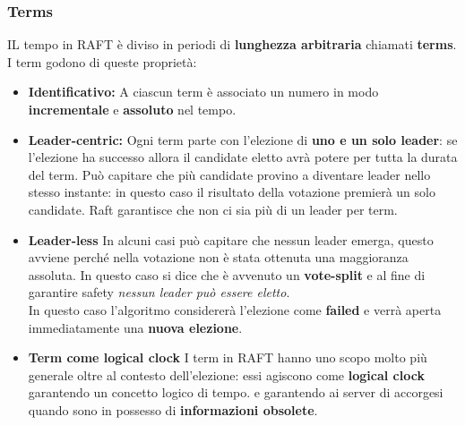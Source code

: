   \subsubsection{Terms}
  IL tempo in RAFT è diviso in periodi di \textbf{lunghezza arbitraria} chiamati \textbf{terms}. I term godono di queste proprietà:
  \begin{itemize}
    \item{\textbf{Identificativo:}}
    A ciascun term è associato un numero in modo \textbf{incrementale} e \textbf{assoluto} nel tempo.
    \item{\textbf{Leader-centric:}}
    Ogni term parte con l'elezione di \textbf{uno e un solo leader}: se l'elezione ha successo allora il candidate eletto avrà potere per tutta la durata del term. Può capitare che più candidate provino a diventare leader nello stesso instante: in questo caso il risultato della votazione premierà un solo candidate. Raft garantisce che non ci sia più di un leader per term.
    \item{\textbf{Leader-less}}
    In alcuni casi può capitare che nessun leader emerga, questo avviene perché nella votazione non è stata ottenuta una maggioranza assoluta. In questo caso si dice che è avvenuto un \textbf{vote-split} e al fine di garantire safety \textit{nessun leader può essere eletto}.\\
    In questo caso l'algoritmo considererà l'elezione come \textbf{failed} e verrà aperta immediatamente una \textbf{nuova elezione}.
    \item{\textbf{Term come logical clock}}
    I term in RAFT hanno uno scopo molto più generale oltre al contesto dell'elezione: essi agiscono come \textbf{logical clock} \cite{Lamport:1978} garantendo un concetto logico di tempo. e garantendo ai server di accorgesi quando sono in possesso di \textbf{informazioni obsolete}.
  \end{itemize}
